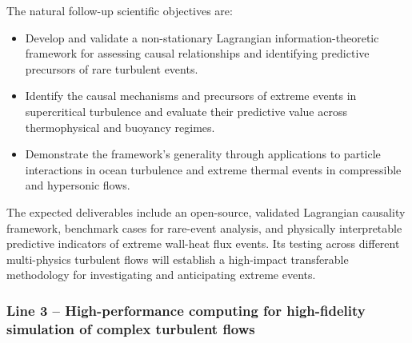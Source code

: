 \documentclass[11pt]{article}
\begin{document}
The natural follow-up scientific objectives are:
\begin{itemize}
	\item[\textbf{O4.}] Develop and validate a non-stationary Lagrangian information-theoretic framework for assessing causal relationships and identifying predictive precursors of rare turbulent events.
	\item[\textbf{O5.}] Identify the causal mechanisms and precursors of extreme events in supercritical turbulence and evaluate their predictive value across thermophysical and buoyancy regimes.
	\item[\textbf{O6.}] Demonstrate the framework's generality through applications to particle interactions in ocean turbulence and extreme thermal events in compressible and hypersonic flows.
\end{itemize}
The expected deliverables include an open-source, validated Lagrangian causality framework, benchmark cases for rare-event analysis, and physically interpretable predictive indicators of extreme wall-heat flux events.
Its testing across different multi-physics turbulent flows will establish a high-impact transferable methodology for investigating and anticipating extreme events.

\subsubsection{Line 3 -- High-performance computing for high-fidelity simulation of complex turbulent flows}
\end{document}
